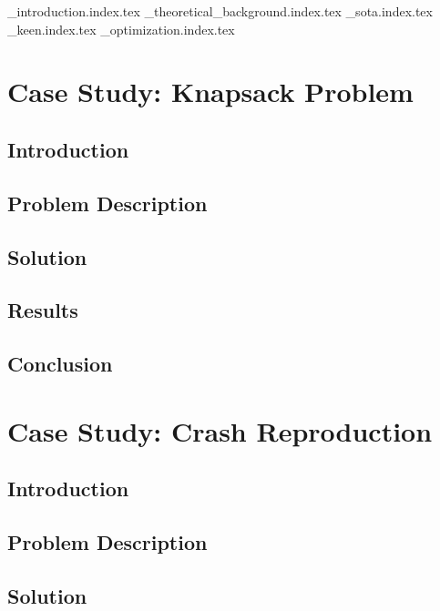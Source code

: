 \pagestyle{fancy}
{_introduction.index.tex}
{_theoretical_background.index.tex}
{_sota.index.tex}
{_keen.index.tex}
{_optimization.index.tex}

\chapter{Case Study: Knapsack Problem}
\label{chap:case_study_knapsack}
  \section{Introduction}
  \label{sec:introduction}
    \Blindtext
  \section{Problem Description}
  \label{sec:problem_description}
    \Blindtext
  \section{Solution}
  \label{sec:solution}
    \Blindtext
  \section{Results}
  \label{sec:results}
    \Blindtext
  \section{Conclusion}
  \label{sec:conclusion}
    \Blindtext

\chapter{Case Study: Crash Reproduction}
\label{chap:beacon}
  \section{Introduction}
  \label{sec:introduction}
    \Blindtext
  \section{Problem Description}
  \label{sec:problem_description}
    \Blindtext
  \section{Solution}
  \label{sec:solution}
    \Blindtext
